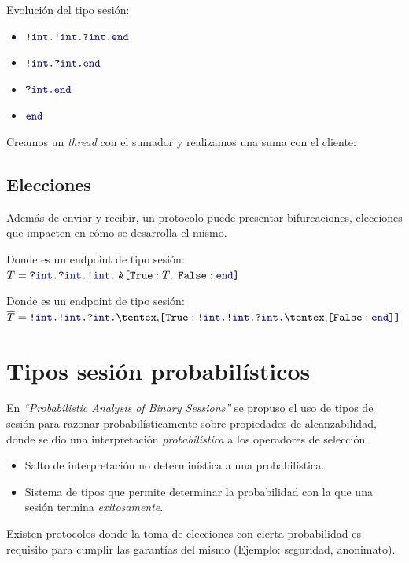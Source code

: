 \begin{frame}{\insertsubsection}
	\SumClient
	Evolución del tipo sesión:
	\begin{itemize}
		\item {} $\Out\tint{ \Out\tint{ \In\tint\End } }$
		\item {} $\Out\tint{ \In\tint\End }$
		\item {} $\In\tint\End$
		\item {} $\End$
	\end{itemize}
\end{frame}

\begin{frame}{\insertsubsection}
	\SumServer
	Creamos un \emph{thread} con el sumador y realizamos una suma con el cliente:
	\SumExample
\end{frame}

\subsection{Elecciones}

\begin{frame}{\insertsubsection}
	Además de enviar y recibir, un protocolo puede presentar bifurcaciones,
	elecciones que impacten en cómo se desarrolla el mismo.

	\SumServerRec

	Donde  es un endpoint de tipo sesión: $\SessionType = \In\tint{ \In\tint{
		\Out\tint\BinaryPBranch[]\T\End } }$
\end{frame}

\begin{frame}{\insertsubsection}
	\SumThreeNumClient
	Donde  es un endpoint de tipo sesión: $\dual\SessionType = \Out\tint{ \Out\tint{
		\In\tint{\Choice\set{\Tag[True]: \Out\tint{ \Out\tint{
		\In\tint{\Choice\set{\Tag[False]: \End} }}}} }}}$
\end{frame}

\section{Tipos sesión probabilísticos}

\begin{frame}{\insertsection}
	En \emph{``Probabilistic Analysis of Binary Sessions''} se propuso el uso de tipos de sesión
	para razonar probabilísticamente sobre propiedades de alcanzabilidad,
	donde se dio una interpretación \emph{probabilística} a los operadores
	de selección.

	\begin{itemize}
		\item Salto de interpretación no determinística a una
		probabilística.
		\item Sistema de tipos que permite determinar la probabilidad con la que una
			sesión termina \emph{exitosamente}.
	\end{itemize}

	Existen protocolos donde la toma de elecciones con cierta probabilidad
	es requisito para cumplir las garantías del mismo (Ejemplo: seguridad, anonimato).
\end{frame}

